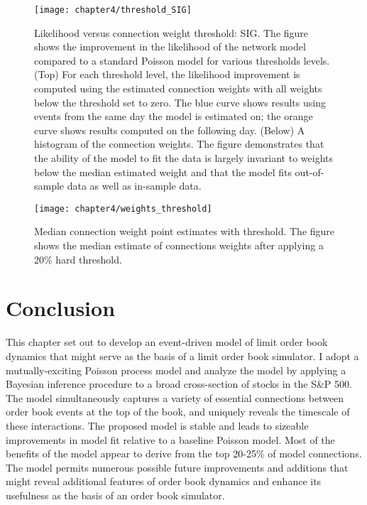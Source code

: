 			\begin{figure}[p]
				\small
				\linespread{1}
				\centering
				\captionsetup{labelsep=colon, font=footnotesize, justification=centerfirst, width=\linewidth}
				\texttt{[image: chapter4/threshold\_SIG]}
				\captionsetup{skip=-20pt, position=below, font=footnotesize, justification=justified, width=\linewidth}
				\caption[Likelihood versus connection weight threshold: SIG]{Likelihood versus connection weight threshold: SIG. The figure shows the improvement in the likelihood of the network model compared to a standard Poisson model for various thresholds levels. (Top) For each threshold level, the likelihood improvement is computed using the estimated connection weights with all weights below the threshold set to zero. The blue curve shows results using events from the same day the model is estimated on; the orange curve shows results computed on the following day. (Below) A histogram of the connection weights. The figure demonstrates that the ability of the model to fit the data is largely invariant to weights below the median estimated weight and that the model fits out-of-sample data as well as in-sample data.}
				\label{fig:threshold_SIG}
			\end{figure}

			\begin{figure}[p]
				\small
				\linespread{1}
				\centering
				\texttt{[image: chapter4/weights\_threshold]}
				\captionsetup{skip=-20pt, position=below, font=footnotesize, justification=justified, width=\linewidth}
				\caption[Median connection weight point estimates with threshold]{Median connection weight point estimates with threshold. The figure shows the median estimate of connections weights after applying a 20\% hard threshold.}
				\label{fig:weights_threshold}
			\end{figure}


\section{Conclusion}
	This chapter set out to develop an event-driven model of limit order book dynamics that might serve as the basis of a limit order book simulator. I adopt a mutually-exciting Poisson process model and analyze the model by applying a Bayesian inference procedure to a broad cross-section of stocks in the S\&P 500. The model simultaneously captures a variety of essential connections between order book events at the top of the book, and uniquely reveals the timescale of these interactions. The proposed model is stable and leads to sizeable improvements in model fit relative to a baseline Poisson model. Most of the benefits of the model appear to derive from the top 20-25\% of model connections. The model permits numerous possible future improvements and additions that might reveal additional features of order book dynamics and enhance its usefulness as the basis of an order book simulator.
